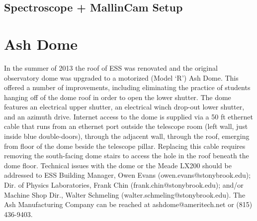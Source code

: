 \documentclass[12pt,titlepage]{article}
\begin{document}
\subsection{Spectroscope + MallinCam Setup}


\section{Ash Dome}
In the summer of 2013 the roof of ESS was renovated and the original observatory dome was upgraded to a motorized (Model `R') Ash Dome.
This offered a number of improvements, including eliminating the practice of students hanging off of the dome roof in order to open the lower shutter.
The dome features an electrical upper shutter, an electrical winch drop-out lower shutter, and an azimuth drive.
Internet access to the dome is supplied via a 50 ft ethernet cable that runs from an ethernet port outside the telescope room (left wall, just inside blue double-doors), through the adjacent wall, through the roof, emerging from floor of the dome beside the telescope pillar.
Replacing this cable requires removing the south-facing dome stairs to access the hole in the roof beneath the dome floor.
Technical issues with the dome or the Meade LX200 should be addressed to ESS Building Manager, Owen Evans (owen.evans@stonybrook.edu); Dir. of Physics Laboratories, Frank Chin (frank.chin@stonybrook.edu); and/or Machine Shop Dir., Walter Schmeling (walter.schmeling@stonybrook.edu). The Ash Manufacturing Company can be reached at ashdome@ameritech.net or (815) 436-9403.
\end{document}
